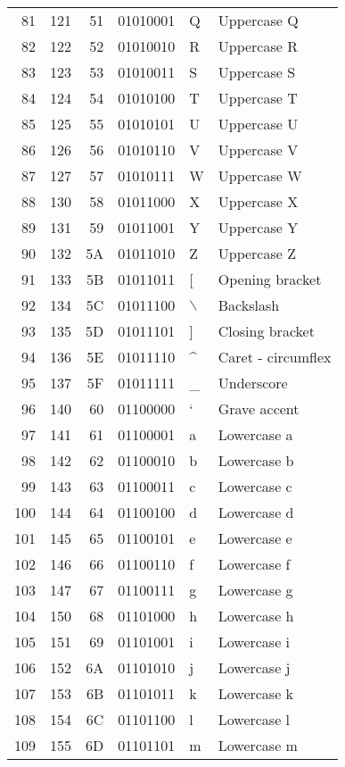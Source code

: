 \documentclass[11pt]{article}
\begin{document}
\begin{longtable}{rrrrll}
81 & 121 & 51 & 01010001 & Q & Uppercase Q\\[0pt]
82 & 122 & 52 & 01010010 & R & Uppercase R\\[0pt]
83 & 123 & 53 & 01010011 & S & Uppercase S\\[0pt]
84 & 124 & 54 & 01010100 & T & Uppercase T\\[0pt]
85 & 125 & 55 & 01010101 & U & Uppercase U\\[0pt]
86 & 126 & 56 & 01010110 & V & Uppercase V\\[0pt]
87 & 127 & 57 & 01010111 & W & Uppercase W\\[0pt]
88 & 130 & 58 & 01011000 & X & Uppercase X\\[0pt]
89 & 131 & 59 & 01011001 & Y & Uppercase Y\\[0pt]
90 & 132 & 5A & 01011010 & Z & Uppercase Z\\[0pt]
91 & 133 & 5B & 01011011 & [ & Opening bracket\\[0pt]
92 & 134 & 5C & 01011100 & $\backslash$ & Backslash\\[0pt]
93 & 135 & 5D & 01011101 & ] & Closing bracket\\[0pt]
94 & 136 & 5E & 01011110 & \^{} & Caret - circumflex\\[0pt]
95 & 137 & 5F & 01011111 & \_ & Underscore\\[0pt]
96 & 140 & 60 & 01100000 & ` & Grave accent\\[0pt]
97 & 141 & 61 & 01100001 & a & Lowercase a\\[0pt]
98 & 142 & 62 & 01100010 & b & Lowercase b\\[0pt]
99 & 143 & 63 & 01100011 & c & Lowercase c\\[0pt]
100 & 144 & 64 & 01100100 & d & Lowercase d\\[0pt]
101 & 145 & 65 & 01100101 & e & Lowercase e\\[0pt]
102 & 146 & 66 & 01100110 & f & Lowercase f\\[0pt]
103 & 147 & 67 & 01100111 & g & Lowercase g\\[0pt]
104 & 150 & 68 & 01101000 & h & Lowercase h\\[0pt]
105 & 151 & 69 & 01101001 & i & Lowercase i\\[0pt]
106 & 152 & 6A & 01101010 & j & Lowercase j\\[0pt]
107 & 153 & 6B & 01101011 & k & Lowercase k\\[0pt]
108 & 154 & 6C & 01101100 & l & Lowercase l\\[0pt]
109 & 155 & 6D & 01101101 & m & Lowercase m\\[0pt]

\end{longtable}
\end{document}
